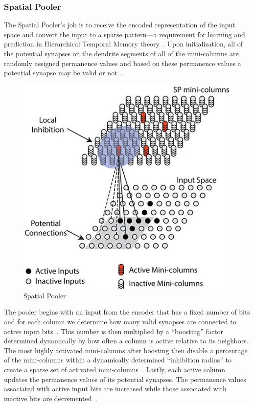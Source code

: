 \documentclass[oneside,12pt,openany]{book}
\begin{document}
	\subsubsection{Spatial Pooler}

	The Spatial Pooler's job is to receive the encoded representation of the input space and convert the input to a sparse pattern---a requirement for learning and prediction in Hierarchical Temporal Memory theory~\cite{Whitepaper}. Upon initialization, all of the potential synapses on the dendrite segments of all of the mini-columns are randomly assigned permanence values and based on these permanence values a potential synapse may be valid or not~\cite{Whitepaper}. 

	\begin{figure}[hbt!]
		\centering
		\includegraphics[width=.6\linewidth]{images/SpatialPooler.jpg}
		\caption[Spatial Pooler]{Spatial Pooler \cite{TheHTMSpatialPooler}}
		\label{fig:SpatialPooler}
	\end{figure}

	
	The pooler begins with an input from the encoder that has a fixed number of bits and for each column we determine how many valid synapses are connected to active input bits~\cite{Whitepaper}. This number is then multiplied by a ``boosting'' factor determined dynamically by how often a column is active relative to its neighbors. The most highly activated mini-columns after boosting then disable a percentage of the mini-columns within a dynamically determined ``inhibition radius'' to create a sparse set of activated mini-columns~\cite{Whitepaper}. Lastly, each active column updates the permanence values of its potential synapses. The permanence values associated with active input bits are increased while those associated with inactive bits are decremented~\cite{Whitepaper}.
\end{document}
